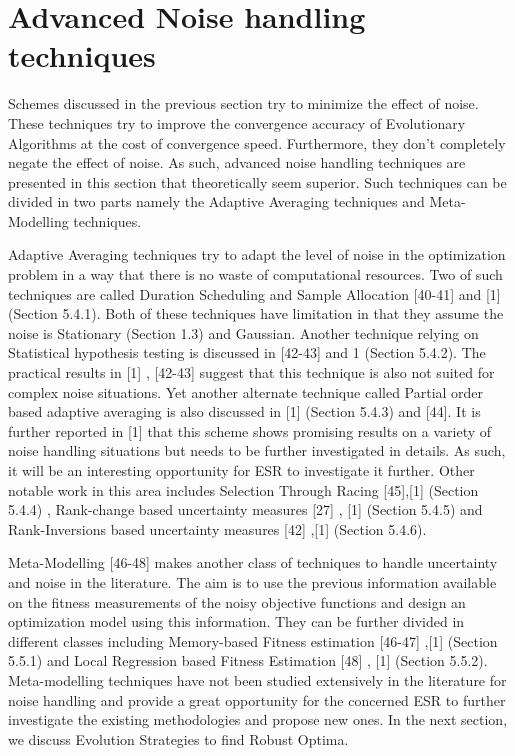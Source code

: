 \section {Advanced Noise handling techniques}

Schemes discussed in the previous section try to minimize the effect of noise. These techniques try to improve the convergence accuracy of Evolutionary Algorithms at the cost of convergence speed. Furthermore, they don't completely negate the effect of noise. As such, advanced noise handling techniques are presented in this section that theoretically seem superior. Such techniques can be divided in two parts namely the Adaptive Averaging techniques and Meta-Modelling techniques. 

Adaptive Averaging techniques try to adapt the level of noise in the optimization problem in a way that there is no waste of computational resources. Two of such techniques are called Duration Scheduling and Sample Allocation [40-41] and [1] (Section 5.4.1). Both of these techniques have limitation in that they assume the noise is Stationary (Section 1.3) and Gaussian. Another technique relying on Statistical hypothesis testing is discussed in [42-43] and 1 (Section 5.4.2). The practical results in [1] , [42-43] suggest that this technique is also not suited for complex noise situations. Yet another alternate technique called Partial order based adaptive averaging is also discussed in [1] (Section 5.4.3) and [44]. It is further reported in [1] that this scheme shows promising results on a variety of noise handling situations but needs to be further investigated in details. As such, it will be an interesting opportunity for ESR to investigate it further. Other notable work in this area includes Selection Through Racing [45],[1] (Section 5.4.4) , Rank-change based uncertainty measures [27] , [1] (Section 5.4.5) and Rank-Inversions based uncertainty measures [42] ,[1] (Section 5.4.6). 

Meta-Modelling [46-48] makes another class of techniques to handle uncertainty and noise in the literature. The aim is to use the previous information available on the fitness measurements of the noisy objective functions and design an optimization model using this information. They can be further divided in different classes including Memory-based Fitness estimation [46-47] ,[1] (Section 5.5.1) and Local Regression based Fitness Estimation [48] , [1] (Section 5.5.2). Meta-modelling techniques have not been studied extensively in the literature for noise handling and provide a great opportunity for the concerned ESR to further investigate the existing methodologies and propose new ones. In the next section, we discuss Evolution Strategies to find Robust Optima.   

